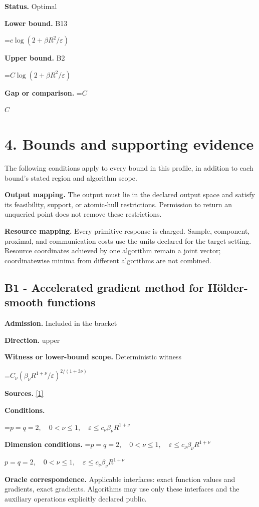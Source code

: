 \documentclass[10pt,a4paper]{article}
\newcommand{\AtlasMath}[1]{\par\begingroup\centering\setbox0=\hbox{$\displaystyle #1$}\ifdim\wd0>1.4\linewidth\typeout{ATLAS WIDE FORMULA: \the\wd0}\fi\ifdim\wd0>\linewidth\resizebox{\linewidth}{!}{\box0}\else\box0\fi\par\endgroup}
\newcommand{\AtlasInlineMath}[1]{\begingroup\setbox0=\hbox{$#1$}\ifdim\wd0>.4\linewidth\endgroup\AtlasMath{#1}\else\endgroup$#1$\fi}
\begin{document}
\textbf{Status.} Optimal

\textbf{Lower bound.} B13

\AtlasMath{c\log(2+\beta R^2/\varepsilon)}
\textbf{Upper bound.} B2

\AtlasMath{C\log(2+\beta R^2/\varepsilon)}
\textbf{Gap or comparison.} \AtlasInlineMath{C}

\section{4. Bounds and supporting evidence}
The following conditions apply to every bound in this profile, in addition to each bound's stated region and algorithm scope.

\textbf{Output mapping.} The output must lie in the declared output space and satisfy its feasibility, support, or atomic-hull restrictions. Permission to return an unqueried point does not remove these restrictions.

\textbf{Resource mapping.} Every primitive response is charged. Sample, component, proximal, and communication costs use the units declared for the target setting. Resource coordinates achieved by one algorithm remain a joint vector; coordinatewise minima from different algorithms are not combined.

\subsection{B1 - Accelerated gradient method for Hölder-smooth functions}
\textbf{Admission.} Included in the bracket

\textbf{Direction.} upper

\textbf{Witness or lower-bound scope.} Deterministic witness

\AtlasMath{C_\nu(\beta_\nu R^{1+\nu}/\varepsilon)^{2/(1+3\nu)}}
\textbf{Sources.} \href{https://optimization-online.org/wp-content/uploads/2010/12/2865.pdf}{[1]}

\textbf{Conditions.} 
\AtlasMath{p=q=2,\quad0<\nu\le1,\quad\varepsilon\le c_\nu\beta_\nu R^{1+\nu}}


\textbf{Dimension conditions.} \AtlasInlineMath{p=q=2,\quad0<\nu\le1,\quad\varepsilon\le c_\nu\beta_\nu R^{1+\nu}}

\textbf{Oracle correspondence.} Applicable interfaces: exact function values and gradients, exact gradients. Algorithms may use only these interfaces and the auxiliary operations explicitly declared public.
\end{document}
